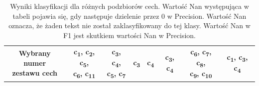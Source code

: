 \documentclass{classrep}
\begin{document}
\newpage


\begin{table}[h!]
\caption{Wyniki klasyfikacji dla różnych podzbiorów cech. Wartość Nan występująca w tabeli pojawia się, gdy następuje dzielenie przez 0 w Precision. Wartość Nan oznacza, że żaden tekst nie został zaklasyfikowany do tej klasy. Wartość Nan w F1 jest skutkiem wartości Nan w Precision.}
\centering
\vspace{0.1cm}
 \begin{tabular}{c c c c c c c c}

    \makecell{\textbf{Wybrany numer} \\\textbf{zestawu cech}} & \makecell{\textbf{c\textsubscript{1},  c\textsubscript{2}, c\textsubscript{5},} \\\textbf{ c\textsubscript{6}, c\textsubscript{11}}} & \makecell{\textbf{c\textsubscript{3},  c\textsubscript{4},} \\ \textbf{c\textsubscript{5},  c\textsubscript{7}}}  & \textbf{ c\textsubscript{3}}  & \textbf{ c\textsubscript{4}}  & \textbf{ c\textsubscript{3},  c\textsubscript{4}} & 
\makecell{\textbf{c\textsubscript{6}, c\textsubscript{7}, c\textsubscript{8},} \\\textbf{ c\textsubscript{9}, c\textsubscript{10}}} &  \textbf{ c\textsubscript{1}, c\textsubscript{3}, c\textsubscript{4}} \\


\end{tabular}
\end{table}
\end{document}
